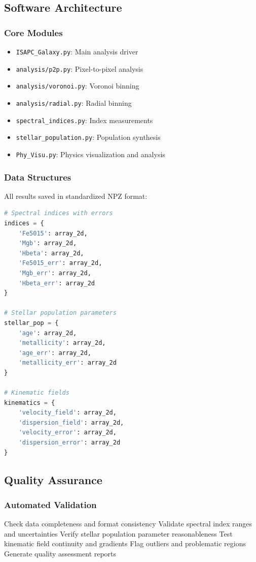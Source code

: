 \documentclass[12pt,a4paper]{article}
\begin{document}
\subsection{Software Architecture}

\subsubsection{Core Modules}
\begin{itemize}
    \item \texttt{ISAPC\_Galaxy.py}: Main analysis driver
    \item \texttt{analysis/p2p.py}: Pixel-to-pixel analysis
    \item \texttt{analysis/voronoi.py}: Voronoi binning
    \item \texttt{analysis/radial.py}: Radial binning
    \item \texttt{spectral\_indices.py}: Index measurements
    \item \texttt{stellar\_population.py}: Population synthesis
    \item \texttt{Phy\_Visu.py}: Physics visualization and analysis
\end{itemize}

\subsubsection{Data Structures}
All results saved in standardized NPZ format:
\begin{lstlisting}[language=Python]
# Spectral indices with errors
indices = {
    'Fe5015': array_2d,
    'Mgb': array_2d, 
    'Hbeta': array_2d,
    'Fe5015_err': array_2d,
    'Mgb_err': array_2d,
    'Hbeta_err': array_2d
}

# Stellar population parameters
stellar_pop = {
    'age': array_2d,
    'metallicity': array_2d,
    'age_err': array_2d,
    'metallicity_err': array_2d
}

# Kinematic fields
kinematics = {
    'velocity_field': array_2d,
    'dispersion_field': array_2d,
    'velocity_error': array_2d,
    'dispersion_error': array_2d
}
\end{lstlisting}

\subsection{Quality Assurance}

\subsubsection{Automated Validation}
\begin{algorithm}
\caption{Quality Control Pipeline}
\begin{algorithmic}[1]
\STATE Check data completeness and format consistency
\STATE Validate spectral index ranges and uncertainties
\STATE Verify stellar population parameter reasonableness  
\STATE Test kinematic field continuity and gradients
\STATE Flag outliers and problematic regions
\STATE Generate quality assessment reports
\end{algorithmic}
\end{algorithm}
\end{document}
